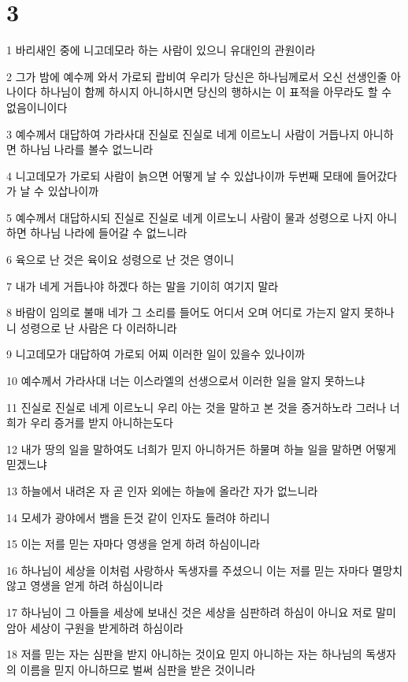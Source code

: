 \chapter{3}

\par 1 바리새인 중에 니고데모라 하는 사람이 있으니 유대인의 관원이라
\par 2 그가 밤에 예수께 와서 가로되 랍비여 우리가 당신은 하나님께로서 오신 선생인줄 아나이다 하나님이 함께 하시지 아니하시면 당신의 행하시는 이 표적을 아무라도 할 수 없음이니이다
\par 3 예수께서 대답하여 가라사대 진실로 진실로 네게 이르노니 사람이 거듭나지 아니하면 하나님 나라를 볼수 없느니라
\par 4 니고데모가 가로되 사람이 늙으면 어떻게 날 수 있삽나이까 두번째 모태에 들어갔다가 날 수 있삽나이까
\par 5 예수께서 대답하시되 진실로 진실로 네게 이르노니 사람이 물과 성령으로 나지 아니하면 하나님 나라에 들어갈 수 없느니라
\par 6 육으로 난 것은 육이요 성령으로 난 것은 영이니
\par 7 내가 네게 거듭나야 하겠다 하는 말을 기이히 여기지 말라
\par 8 바람이 임의로 불매 네가 그 소리를 들어도 어디서 오며 어디로 가는지 알지 못하나니 성령으로 난 사람은 다 이러하니라
\par 9 니고데모가 대답하여 가로되 어찌 이러한 일이 있을수 있나이까
\par 10 예수께서 가라사대 너는 이스라엘의 선생으로서 이러한 일을 알지 못하느냐
\par 11 진실로 진실로 네게 이르노니 우리 아는 것을 말하고 본 것을 증거하노라 그러나 너희가 우리 증거를 받지 아니하는도다
\par 12 내가 땅의 일을 말하여도 너희가 믿지 아니하거든 하물며 하늘 일을 말하면 어떻게 믿겠느냐
\par 13 하늘에서 내려온 자 곧 인자 외에는 하늘에 올라간 자가 없느니라
\par 14 모세가 광야에서 뱀을 든것 같이 인자도 들려야 하리니
\par 15 이는 저를 믿는 자마다 영생을 얻게 하려 하심이니라
\par 16 하나님이 세상을 이처럼 사랑하사 독생자를 주셨으니 이는 저를 믿는 자마다 멸망치 않고 영생을 얻게 하려 하심이니라
\par 17 하나님이 그 아들을 세상에 보내신 것은 세상을 심판하려 하심이 아니요 저로 말미암아 세상이 구원을 받게하려 하심이라
\par 18 저를 믿는 자는 심판을 받지 아니하는 것이요 믿지 아니하는 자는 하나님의 독생자의 이름을 믿지 아니하므로 벌써 심판을 받은 것이니라
